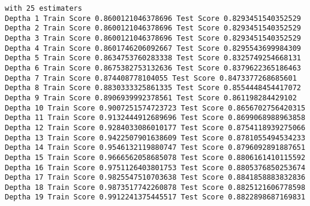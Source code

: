 \documentclass[11pt]{article}
\begin{document}
    \begin{Verbatim}[commandchars=\\\{\}]
with 25 estimaters
Deptha 1 Train Score 0.8600121046378696 Test Score 0.8293451540352529
Deptha 2 Train Score 0.8600121046378696 Test Score 0.8293451540352529
Deptha 3 Train Score 0.8600121046378696 Test Score 0.8293451540352529
Deptha 4 Train Score 0.8601746206092667 Test Score 0.8295543699984309
Deptha 5 Train Score 0.8634753760283338 Test Score 0.8325749254668131
Deptha 6 Train Score 0.8675382753132636 Test Score 0.8379622365186463
Deptha 7 Train Score 0.874408778104055 Test Score 0.8473377268685601
Deptha 8 Train Score 0.8830333325861335 Test Score 0.8554448454417072
Deptha 9 Train Score 0.8906939992378561 Test Score 0.861198284429102
Deptha 10 Train Score 0.9007251574723723 Test Score 0.8656702756420315
Deptha 11 Train Score 0.9132444912689696 Test Score 0.8699068988963858
Deptha 12 Train Score 0.9284033086010177 Test Score 0.8754118939275066
Deptha 13 Train Score 0.9422507901638609 Test Score 0.8781055494534233
Deptha 14 Train Score 0.9546132119880747 Test Score 0.8796092891887651
Deptha 15 Train Score 0.9666562058685078 Test Score 0.8806161410115592
Deptha 16 Train Score 0.9751126403801753 Test Score 0.8805376850253674
Deptha 17 Train Score 0.9825547510703638 Test Score 0.8841858883832836
Deptha 18 Train Score 0.9873517742260878 Test Score 0.8825121606778598
Deptha 19 Train Score 0.9912241375445517 Test Score 0.8822898687169831

    \end{Verbatim}
\end{document}
